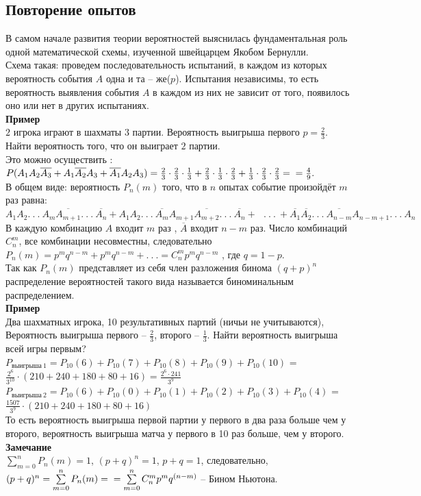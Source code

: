 \documentclass[russian, 12pt, fleqn]{article}
\begin{document}
\subsection{Повторение опытов}
\noindent
В самом начале развития теории вероятностей выяснилась фундаментальная роль одной математической схемы, изученной швейцарцем Якобом Бернулли.\\
Схема такая: проведем последовательность испытаний, в каждом из которых вероятность события $A$ одна и та -- же($p$). Испытания независимы, то есть вероятность выявления события $A$ в каждом из них не зависит от того, появилось оно или нет в других испытаниях.\\
\textbf{Пример\ }\\ $2$ игрока играют в шахматы $3$ партии. Вероятность выигрыша первого $p = \frac{2}{3}$. Найти вероятность того, что он выиграет $2$ партии.\\
Это можно осуществить : $P(A_1A_2\overline{A_3} + A_1\overline{A_2}A_3 + \overline{A_1}A_2A_3)=\frac{2}{3}\cdot\frac{2}{3}\cdot\frac{1}{3} + \frac{2}{3}\cdot\frac{1}{3}\cdot\frac{2}{3} + \frac{1}{3}\cdot\frac{2}{3}\cdot\frac{2}{3} =\\ = \frac{4}{9}.$\\
В общем виде: вероятность $P_n(m)$  того, что в $n$ опытах событие произойдёт $m$ раз равна: $A_1A_2.\ . \ . \ A_m\overline{A_{m+1}}.\ .\ .\ \overline{A_n} + 
A_1A_2.\ . \ . \ \overline{A_m} A_{m+1} \overline{A_{m+2}} .\ .\ .\ \overline{A_n} +
\ \ \ .\ .\ .\ 
+\overline{A_1}\overline{A_2}.\ . \ . \ \overline{A_{n-m}} {A_{n-m+1}} .\ .\ .\ A_n$
В каждую комбинацию $A$ входит $m$ раз ,  $\overline{A}$ входит $n - m$ раз.
Число комбинаций $C^m_n$, все комбинации несовместны, следовательно $P_n(m) = p^mq^{n-m} + p^mq^{n-m} + .\ .\ . = C^m_np^mq^{n-m}$ , где $q = 1 - p$.\\
Так как ${P_n(m)}$ представляет из себя член разложения бинома {$(q+p)^n$}\\
 распределение вероятностей такого вида называется биноминальным распределением.\\
\textbf{Пример\ }\\
Два шахматных игрока, 10 результативных партий (ничьи не учитываются), Вероятность выигрыша первого -- $\frac{2}{3}$, второго -- $\frac{1}{3}$. Найти вероятность выигрыша
 всей игры первым?\\
$P_{выигрыша\ 1} = P_{10}(6) + P_{10}(7) + P_{10}(8) + P_{10}(9) +  P_{10}(10)$ = $\frac{2^6}{3^{10}}\cdot(210+240+180+80+16) = \frac{2^6\cdot241}{3^{9}}$
$P_{выигрыша\ 2} = P_{10}(6) + P_{10}(0) + P_{10}(1) + P_{10}(2) +  P_{10}(3)  +  P_{10}(4)$ = $\frac{1507}{3^{9}}\cdot(210+240+180+80+16)$\\
То есть вероятность выигрыша первой партии у первого в два раза больше чем у второго, вероятность выигрыша матча у первого в 10 раз больше, чем у второго.\\
\textbf{Замечание\ } \\
$\sum\limits_{m = 0}^{n}P_n(m) = 1$, $(p+q)^n=1$, $p+q = 1$, следовательно, $(p+q)^n = \sum\limits_{m = 0}^{n}P_n(m)  =\\= \sum\limits_{m = 0}^{n}C^m_np^mq^{(n-m)}$ -- Бином Ньютона.\\
\end{document}
